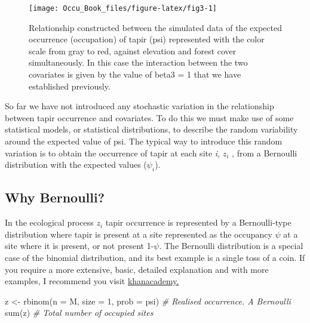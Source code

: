 \documentclass[
]{book}
\newenvironment{Shaded}{\begin{snugshade}}{\end{snugshade}}
\newcommand{\AttributeTok}[1]{\textcolor[rgb]{0.77,0.63,0.00}{#1}}
\newcommand{\CommentTok}[1]{\textcolor[rgb]{0.56,0.35,0.01}{\textit{#1}}}
\newcommand{\DecValTok}[1]{\textcolor[rgb]{0.00,0.00,0.81}{#1}}
\newcommand{\FunctionTok}[1]{\textcolor[rgb]{0.00,0.00,0.00}{#1}}
\newcommand{\NormalTok}[1]{#1}
\newcommand{\OtherTok}[1]{\textcolor[rgb]{0.56,0.35,0.01}{#1}}
\begin{document}
\begin{figure}
\texttt{[image: Occu\_Book\_files/figure-latex/fig3-1]} \caption[fig3]{Relationship constructed between the simulated data of the expected occurrence (occupation) of tapir (psi) represented with the color scale from gray to red, against elevation and forest cover simultaneously. In this case the interaction between the two covariates is given by the value of beta3 = 1 that we have established previously.}\label{fig:fig3}
\end{figure}

So far we have not introduced any stochastic variation in the relationship between tapir occurrence and covariates. To do this we must make use of some statistical models, or statistical distributions, to describe the random variability around the expected value of psi. The typical way to introduce this random variation is to obtain the occurrence of tapir at each site \emph{i}, \(z _{i}\) , from a Bernoulli distribution with the expected values (\(\psi _{i}\)).

\hypertarget{why-bernoulli}{%
\subsection{Why Bernoulli?}\label{why-bernoulli}}

In the ecological process \(z _{i}\) tapir occurrence is represented by a Bernoulli-type distribution where tapir is present at a site represented as the occupancy \(\psi\) at a site where it is present, or not present 1-\(\psi\). The Bernoulli distribution is a special case of the binomial distribution, and its best example is a single toss of a coin. If you require a more extensive, basic, detailed explanation and with more examples, I recommend you visit \href{https://www.khanacademy.org/math/statistics-probability/random-variables-stats-library/binomial-mean-standard-dev-formulas/v/mean-and-variance-of-bernoulli-distribution-example}{khanacademy.}

\begin{Shaded}
\begin{Highlighting}[]
\NormalTok{z }\OtherTok{\textless{}{-}} \FunctionTok{rbinom}\NormalTok{(}\AttributeTok{n =}\NormalTok{ M, }\AttributeTok{size =} \DecValTok{1}\NormalTok{, }\AttributeTok{prob =}\NormalTok{ psi)  }\CommentTok{\# Realised occurrence. A Bernoulli}
\FunctionTok{sum}\NormalTok{(z)                                    }\CommentTok{\# Total number of occupied sites}
\end{Highlighting}
\end{Shaded}
\end{document}
